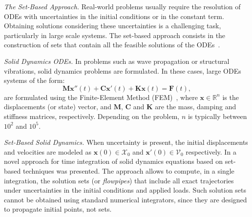 \documentclass{juliacon}
\begin{document}
	


\maketitle

\emph{The Set-Based Approach.} %
%
Real-world problems usually require the resolution of ODEs with uncertainties in the initial conditions or in the constant term. %
%
Obtaining solutions considering these uncertainties is a challenging task, particularly in large scale systems. %
%
The set-based approach consists in the construction of sets that contain all the feasible solutions of the ODEs~\cite{althoff2020set}. %


\vspace{0.2cm}

\emph{Solid Dynamics ODEs.} %
%
In problems such as wave propagation or structural vibrations, solid dynamics problems are formulated. %
%
In these cases, large ODEs systems of the form:
%
\begin{equation}\label{eq:second_order}
\mathbf{M} \mathbf{x}''(t) + \mathbf{C}\mathbf{x}'(t) + \mathbf{K}\mathbf{x}(t) = \mathbf{F}(t),
\end{equation}
%
are formulated using the Finite-Element Method (FEM)~\cite{Bathe2014}, where $\mathbf{x} \in \mathbb{R}^n$ is the displacements (or state) vector, and $\mathbf{M}$, $\mathbf{C}$ and $\mathbf{K}$ are the mass, damping and stiffness matrices, respectively. Depending on the problem, $n$ is typically  between $10^2$ and $10^5$.

	
\vspace{0.2cm}

\emph{Set-Based Solid Dynamics.} %
%
When uncertainty is present, the initial displacements and velocities are modeled as $\mathbf{x}(0) \in \mathcal{X}_0$ and $\mathbf{x}'(0) \in \mathcal{V}_0$ respectively. %
%
In \cite{forets2021combining} a novel approach for time integration of solid dynamics equations based on set-based techniques was presented. %
%
The approach allows to compute, in a single integration, the solution sets (or \emph{flowpipes}) that include all exact trajectories under uncertainties in the initial conditions and applied loads.
%
Such solution sets cannot be obtained using standard numerical integrators, since they are designed to propagate initial points, not sets.

\vspace{0.2cm}
\end{document}
